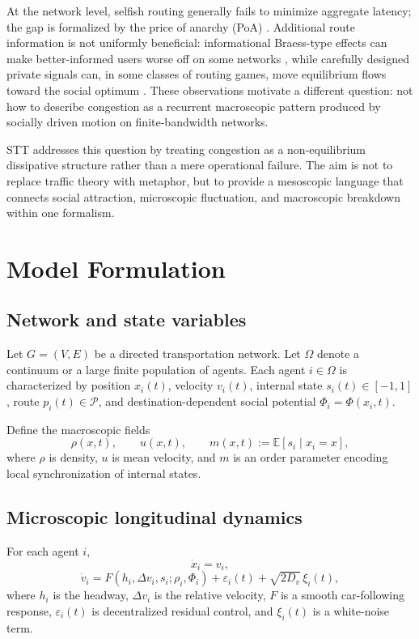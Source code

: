 \documentclass[11pt]{article}
\begin{document}
At the network level, selfish routing generally fails to minimize aggregate latency; the gap is formalized by the price of anarchy (PoA) \cite{Roughgarden2003}. Additional route information is not uniformly beneficial: informational Braess-type effects can make better-informed users worse off on some networks \cite{Acemoglu2018}, while carefully designed private signals can, in some classes of routing games, move equilibrium flows toward the social optimum \cite{Das2017}. These observations motivate a different question: not how to describe congestion as a recurrent macroscopic pattern produced by socially driven motion on finite-bandwidth networks.

STT addresses this question by treating congestion as a non-equilibrium dissipative structure rather than a mere operational failure. The aim is not to replace traffic theory with metaphor, but to provide a mesoscopic language that connects social attraction, microscopic fluctuation, and macroscopic breakdown within one formalism.

\section{Model Formulation}
\subsection{Network and state variables}
Let $G=(V,E)$ be a directed transportation network. Let $\Omega$ denote a continuum or a large finite population of agents. Each agent $i\in\Omega$ is characterized by position $x_i(t)$, velocity $v_i(t)$, internal state $s_i(t)\in[-1,1]$, route $p_i(t)\in\mathcal P$, and destination-dependent social potential $\Phi_i = \Phi(x_i,t)$.

Define the macroscopic fields
\begin{equation}
\rho(x,t),\qquad u(x,t),\qquad m(x,t):=\mathbb E[s_i\mid x_i=x],
\end{equation}
where $\rho$ is density, $u$ is mean velocity, and $m$ is an order parameter encoding local synchronization of internal states.

\subsection{Microscopic longitudinal dynamics}
For each agent $i$,
\begin{equation}
\dot x_i=v_i,
\end{equation}
\begin{equation}
\dot v_i = F(h_i,\Delta v_i,s_i;\rho_i,\Phi_i) + \varepsilon_i(t) + \sqrt{2D_v}\,\xi_i(t),
\end{equation}
where $h_i$ is the headway, $\Delta v_i$ is the relative velocity, $F$ is a smooth car-following response, $\varepsilon_i(t)$ is decentralized residual control, and $\xi_i(t)$ is a white-noise term.
\end{document}
